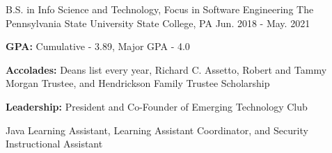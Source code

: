 

\begin{cventries}

  \cventry
    {B.S. in Info Science and Technology, Focus in Software Engineering}
    {The Pennsylvania State University} %
    {State College, PA} %
    {Jun. 2018 - May. 2021} %
    {
      \begin{cvitems} %
        \item {\textbf{GPA:} Cumulative - 3.89, Major GPA - 4.0}
        \item {\textbf{Accolades:} Deans list every year, Richard C. Assetto, Robert and Tammy Morgan Trustee, and Hendrickson Family Trustee Scholarship}
        \item {\textbf{Leadership:} President and Co-Founder of Emerging Technology Club}
        \item {Java Learning Assistant, Learning Assistant Coordinator, and Security Instructional Assistant}
      \end{cvitems}
    }

\end{cventries}
